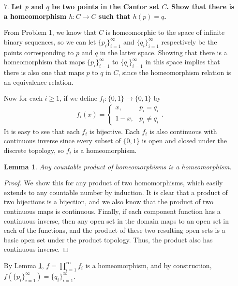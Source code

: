 \documentclass[a4paper,12pt]{article}
\newtheorem{lemma}[theorem]{Lemma}
\begin{document}
\begin{enumerate}
    \item[7.]
        \boldmath\textbf{Let $p$ and $q$ be two points in the Cantor set $C$. Show that there is a homeomorphism $h : C \to C$ such that $h(p) = q$.
        }\unboldmath \par
        From Problem 1, we know that $C$ is homeomorphic to the space of infinite binary sequences, so we can let $\{p_i\}_{i = 1}^\infty$ and $\{q_i\}_{i = 1}^\infty$ respectively be the points corresponding to $p$ and $q$ in the latter space. Showing that there is a homeomorphism that maps $\{p_i\}_{i = 1}^\infty$ to $\{q_i\}_{i = 1}^\infty$ in this space implies that there is also one that maps $p$ to $q$ in $C$, since the homeomorphism relation is an equivalence relation. \par
        Now for each $i \geq 1$, if we define $f_i : \{0, 1\} \to \{0, 1\}$ by
        \begin{align*}
            f_i(x) = \begin{cases}
                x, &p_i = q_i \\
                1 - x, &p_i \neq q_i
            \end{cases}.
        \end{align*}
        It is easy to see that each $f_i$ is bijective. Each $f_i$ is also continuous with continuous inverse since every subset of $\{0, 1\}$ is open and closed under the discrete topology, so $f_i$ is a homeomorphism.
        \begin{lemma} \label{lem:prod-homeo}
            Any countable product of homeomorphisms is a homeomorphism.
        \end{lemma}
        \begin{proof}
            We show this for any product of two homomorphisms, which easily extends to any countable number by induction. It is clear that a product of two bijections is a bijection, and we also know that the product of two continuous maps is continuous. Finally, if each component function has a continuous inverse, then any open set in the domain maps to an open set in each of the functions, and the product of these two resulting open sets is a basic open set under the product topology. Thus, the product also has continuous inverse.
        \end{proof}
        By Lemma \ref{lem:prod-homeo}, $f = \prod_{i = 1}^\infty f_i$ is a homeomorphism, and by construction, $f(\{p_i\}_{i = 1}^\infty) = \{q_i\}_{i = 1}^\infty$. \par


\end{enumerate}
\end{document}
